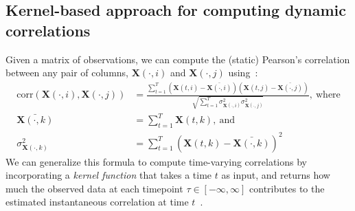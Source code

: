 \documentclass[english]{article}
\begin{document}
\subsection*{Kernel-based approach for computing dynamic correlations}
Given a matrix of observations, we can compute the (static)
Pearson's correlation between any pair of columns, $\mathbf{X}(\cdot, i)$ and
$\mathbf{X}(\cdot, j)$ using~\citep{Pear01}:
\begin{align}
  \mathrm{corr}(\mathbf{X}(\cdot, i), \mathbf{X}(\cdot, j)) &=
                                                              \frac{\sum_{t=1}^T
                                                              \left(\mathbf{X}(t,
                                                              i)
                                                              -
                                                              \bar{\mathbf{X}(\cdot,
                                                              i)}\right)
                                                              \left(\mathbf{X}(t,
                                                              j)
                                                              -
                                                              \bar{\mathbf{X}(\cdot, j)}\right)}{\sqrt{\sum_{t=1}^T
                                                              \sigma^2_{\mathbf{X}(\cdot, i)} 
                                                              \sigma^2_{\mathbf{X}(\cdot, j)}}},~\mathrm{where}\\\label{eqn:corr}
  \bar{\mathbf{X}(\cdot, k)} &= \sum_{t=1}^T
                       \mathbf{X}(t, k),~\mathrm{and}\\
  \sigma^2_{\mathbf{X}(\cdot, k)} &= \sum_{t=1}^T \left( \mathbf{X}(t, k) -
                            \bar{\mathbf{X}(\cdot, k)} \right)^2 
\end{align}
We can generalize this formula to compute time-varying correlations by
incorporating a \textit{kernel function} that takes a time $t$ as
input, and returns how much the observed data at each timepoint
$\tau \in \left[ -\infty, \infty \right]$ contributes to the estimated instantaneous
correlation at time $t$~\citep[Fig.~\ref{fig:kernels}; also see][for a
similar approach]{AlleEtal12b}.
\end{document}
